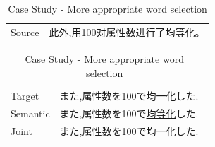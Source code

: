 \begin{table}[h]
    \begin{CJK}{UTF8}{gbsn}
        \begin{tabularx}{\textwidth}{p{1.2cm}b}
            Source & 此外,用100对属性数进行了均等化。 \\
        \end{tabularx}
    \end{CJK}

    \begin{CJK}{UTF8}{ipxm}
        \begin{tabularx}{\textwidth}{p{1.2cm}b}
            Target & また,属性数を100で均一化した. \\
            Semantic & また,属性数を100で\underline{均等化}した. \\
            Joint & また,属性数を100で\underline{均一化}した. \\\midrule
        \end{tabularx}
    \end{CJK}

    \caption{Case Study - More appropriate word selection}
    \label{tab:case_study4}
\end{table}

